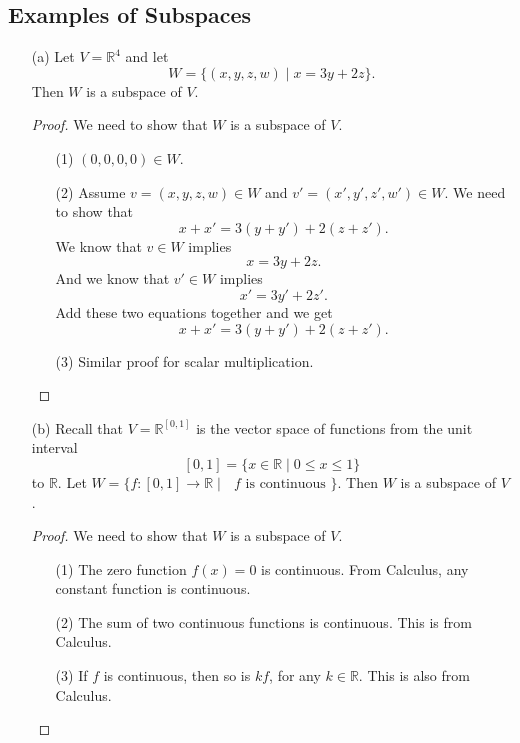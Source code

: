 \documentclass[11pt]{article}
\begin{document}
    \subsection{Examples of Subspaces}

    \begin{enumerate}
        \item[(a)] Let \(V = \mathbb{R}^4\) and let \[W = \{ (x,y,z,w) \mid x = 3y + 2z \}.\] Then $W$ is a subspace of $V$.
        \begin{proof}
            We need to show that $W$ is a subspace of $V$.
            \begin{enumerate}
                \item[(1)] \((0,0,0,0) \in W\).
                \item[(2)] Assume \(v = (x,y,z,w) \in W\) and \(v' = (x',y',z',w') \in W.\) We need to show that \[x + x' = 3(y + y') + 2(z + z').\] We know that \(v \in W\) implies \[x = 3y + 2z.\] And we know that \(v' \in W\) implies \[x' = 3y' + 2z'.\] Add these two equations together and we get \[x + x' = 3(y + y') + 2(z + z').\]
                \item[(3)] Similar proof for scalar multiplication. 
            \end{enumerate}
        \end{proof} 

        \item[(b)] Recall that \(V = \mathbb{R}^{[0,1]}\) is the vector space of functions from the unit interval \[[0,1] = \{x \in \mathbb{R} \mid 0 \leq x \leq 1\}\] to \(\mathbb{R}.\) Let \(W = \{f : [0,1] \rightarrow \mathbb{R} \mid \text{ $f$ is continuous }\}.\) Then $W$ is a subspace of $V$.
        \begin{proof}
            We need to show that $W$ is a subspace of $V$.
            \begin{enumerate}
                \item[(1)] The zero function \(f(x) = 0\) is continuous. From Calculus, any constant function is continuous.
                \item[(2)] The sum of two continuous functions is continuous. This is from Calculus.
                \item[(3)] If $f$ is continuous, then so is $kf$, for any $k \in \mathbb{R}.$ This is also from Calculus.   
            \end{enumerate}
        \end{proof} 


\end{enumerate}
\end{document}

